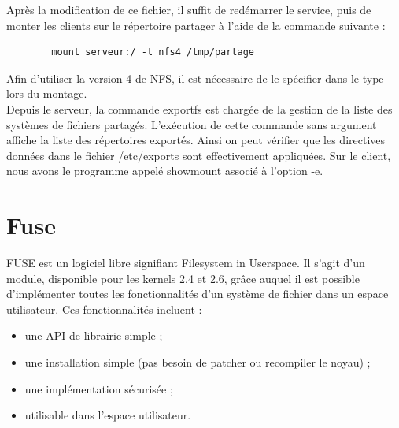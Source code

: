 \documentclass[12pt]{report}
\begin{document}
	  Après la modification de ce fichier, il suffit de redémarrer le service, puis de monter les clients sur le répertoire partager à l'aide de la commande suivante :\\
	  \begin{lstlisting}
	    mount serveur:/ -t nfs4 /tmp/partage
	  \end{lstlisting}
	  Afin d'utiliser la version 4 de NFS, il est nécessaire de le spécifier dans le type lors du montage.\\
Depuis le serveur, la commande exportfs est chargée de la gestion de la liste des systèmes de fichiers partagés. L'exécution de cette commande sans argument affiche la liste des répertoires exportés.
Ainsi on peut vérifier que les directives données dans le fichier /etc/exports sont effectivement appliquées.
Sur le client, nous avons le programme appelé showmount associé à l'option -e.

	  \chapter{Fuse}
	  \label{Fuse}
    FUSE est un logiciel libre signifiant \og Filesystem in Userspace\fg. Il s'agit d'un module, disponible pour les kernels 2.4 et 2.6, grâce auquel 
    il est possible d'implémenter toutes les fonctionnalités d'un système de fichier dans un espace utilisateur. Ces fonctionnalités incluent :\\
	\begin{itemize}
		\item une API de librairie simple ;
		\item une installation simple (pas besoin de patcher ou recompiler le noyau) ;
		\item une implémentation sécurisée ;
		\item utilisable dans l'espace utilisateur.\\
   \end{itemize}
\end{document}
